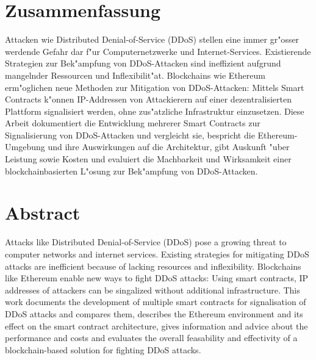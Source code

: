 
\chapter*{Zusammenfassung}


Attacken wie Distributed Denial-of-Service (DDoS) stellen eine immer gr{"o}sser werdende Gefahr dar f{"u}r Computernetzwerke und Internet-Services.
Existierende Strategien zur Bek{"a}mpfung von DDoS-Attacken sind ineffizient aufgrund mangelnder Ressourcen und Inflexibilit{"a}t.
Blockchains wie Ethereum erm{"o}glichen neue Methoden zur Mitigation von DDoS-Attacken: Mittels Smart Contracts k{"o}nnen IP-Addressen von Attackierern auf einer dezentralisierten Plattform signalisiert werden, ohne zus{"a}tzliche Infrastruktur einzusetzen.
Diese Arbeit dokumentiert die Entwicklung mehrerer Smart Contracts zur Signalisierung von DDoS-Attacken und vergleicht sie, bespricht die Ethereum-Umgebung und ihre Auswirkungen auf die Architektur, gibt Auskunft {"u}ber Leistung sowie Kosten und evaluiert die Machbarkeit und Wirksamkeit einer blockchainbasierten L{"o}sung zur Bek{"a}mpfung von DDoS-Attacken.

\chapter*{Abstract}
Attacks like Distributed Denial-of-Service (DDoS) pose a growing threat to computer networks and internet services.
Existing strategies for mitigating DDoS attacks are inefficient because of lacking resources and inflexibility.
Blockchains like Ethereum enable new ways to fight DDoS attacks: Using smart contracts, IP addresses of attackers can be singalized without additional infrastructure.
This work documents the development of multiple smart contracts for signalisation of DDoS attacks and compares them, describes the Ethereum environment and its effect on the smart contract architecture, gives information and advice about the performance and costs and evaluates the overall feasability and effectivity of a blockchain-based solution for fighting DDoS attacks.
